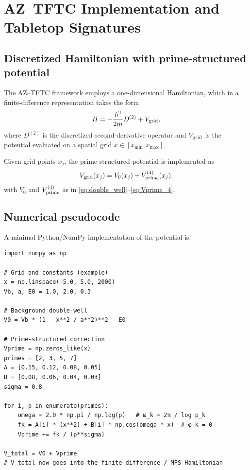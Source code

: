 \documentclass[11pt]{article}
\begin{document}
\section{AZ--TFTC Implementation and Tabletop Signatures}

\subsection{Discretized Hamiltonian with prime-structured potential}

The AZ--TFTC framework employs a one-dimensional Hamiltonian, which in a
finite-difference representation takes the form
\begin{equation}
  H = -\frac{\hbar^2}{2m} D^{(2)} + V_{\rm grid},
\end{equation}
where \(D^{(2)}\) is the discretized second-derivative operator and
\(V_{\rm grid}\) is the potential evaluated on a spatial grid
\(x \in [x_{\min}, x_{\max}]\).\cite{AZ_TFTC_draft}

Given grid points \(x_j\), the prime-structured potential is implemented
as
\begin{equation}
  V_{\rm grid}(x_j) = V_0(x_j) + V_{\rm prime}^{(4)}(x_j),
\end{equation}
with \(V_0\) and \(V_{\rm prime}^{(4)}\) as in
\eqref{eq:double_well}--\eqref{eq:Vprime_4}.

\subsection{Numerical pseudocode}

A minimal Python/NumPy implementation of the potential is:
\begin{verbatim}
import numpy as np

# Grid and constants (example)
x = np.linspace(-5.0, 5.0, 2000)
Vb, a, E0 = 1.0, 2.0, 0.3

# Background double-well
V0 = Vb * (1 - x**2 / a**2)**2 - E0

# Prime-structured correction
Vprime = np.zeros_like(x)
primes = [2, 3, 5, 7]
A = [0.15, 0.12, 0.08, 0.05]
B = [0.08, 0.06, 0.04, 0.03]
sigma = 0.8

for i, p in enumerate(primes):
    omega = 2.0 * np.pi / np.log(p)   # ω_k = 2π / log p_k
    fk = A[i] * (x**2) + B[i] * np.cos(omega * x)  # φ_k = 0
    Vprime += fk / (p**sigma)

V_total = V0 + Vprime
# V_total now goes into the finite-difference / MPS Hamiltonian
\end{verbatim}
\end{document}
